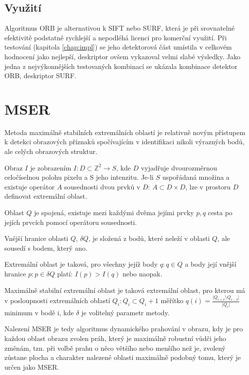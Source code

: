 \subsection{Využití}

Algoritmus ORB je alternativou k SIFT nebo SURF, která je při srovnatelné efektivitě podstatně rychlejší a nepodléhá licenci pro komerční využití. Při testování (kapitola \ref{chap:impl}) se jeho detektorová část umístila v celkovém hodnocení jako nejlepší, deskriptor ovšem vykazoval velmi slabé výsledky. Jako jedna z nejvýkonnějších testovaných kombinací se ukázala kombinace detektor ORB, deskriptor SURF.

		
\section{MSER}

	Metoda maximálně stabilních extremálních oblastí \cite{matas2004robust} je relativně novým přístupem k detekci obrazových příznaků spočívajícím v identifikaci nikoli výrazných bodů, ale celých obrazových struktur.
	
	Obraz $I$ je zobrazením $I: D \subset \mathbb{Z}^2 \rightarrow S$, kde $D$ vyjadřuje dvourozměrnou celočíselnou polohu pixelu a S jeho intenzitu. Je-li $S$ uspořádaná množina a existuje operátor $A$ sousednosti dvou prvků v $D$:  $A \subset D\times D$, lze v prostoru $D$ definovat extremální oblast.
	
	Oblast $Q$ je spojená, existuje mezi každými dvěma jejími prvky $p, q$ cesta po jejích prvcích pomocí operátoru sousednosti.
	
	Vnější hranice oblasti $Q$, $\delta Q$, je složená z bodů, které neleží v oblasti $Q$, ale sousedí s bodem, který ano.
	
	Extremální oblast je taková, pro všechny jejíž body $q: q \in Q$ a body její vnější hranice $p: p \in \delta Q$ platí: $I(p) > I(q)$ nebo naopak.
	
	Maximálně stabilní extremální oblast je taková extremální oblast, pro kterou má v posloupnosti extremálních oblastí $Q_i : Q_i \subset Q_i+1$ měřítko $q(i) = \frac{\lvert Q_{i+\delta} \setminus Q_{i-\delta} \rvert}{\lvert Q_i \rvert}$ minimum v bodě i, kde $\delta$ je volitelný parametr metody.
	
	Nalezení MSER je tedy algoritmus dynamického prahování v obrazu, kdy je pro každou oblast obrazu zvolen práh, který je maximálně robustní vůdči jeho změnám, tzn. při volbě prahu o něco většího nebo menšího než je, zvolený zůstane plocha a charakter nalezené oblasti maximálně podobný tomu, který je určen jako MSER.
	

